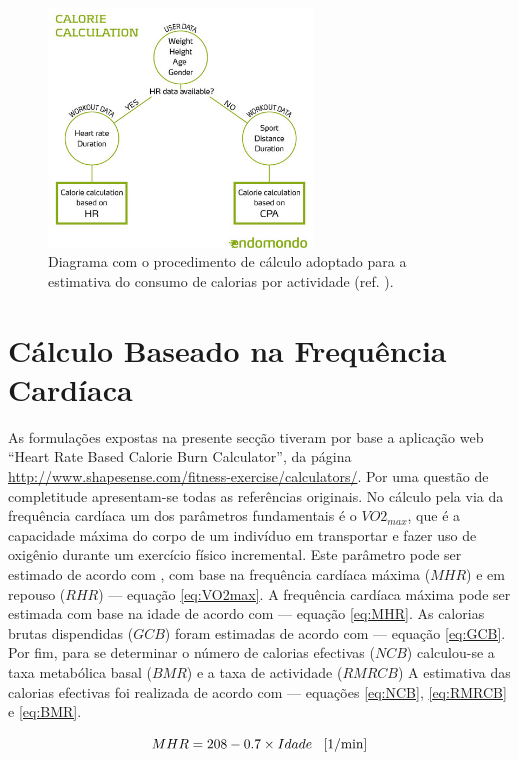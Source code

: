\documentclass[a4paper,10pt]{report}
\begin{document}
\begin{figure}
\centering
\includegraphics[width=7cm]{endomondoCalories.jpg}
\caption{Diagrama com o procedimento de cálculo adoptado para a estimativa do consumo de calorias por actividade (ref. \cite{endomondo}).}
\label{fig:caloriasProcedimento}
\end{figure}

\section{Cálculo Baseado na Frequência Cardíaca}
\label{sec:caloriasFcardio}
As formulações expostas na presente secção tiveram por base a aplicação web ``Heart Rate Based Calorie Burn Calculator'', 
da página \url{http://www.shapesense.com/fitness-exercise/calculators/}. Por uma questão de completitude apresentam-se todas as referências originais.
No cálculo pela via da frequência cardíaca um dos parâmetros fundamentais é o $VO2_{max}$, que é a capacidade máxima do corpo de um 
indivíduo em transportar e fazer uso de oxigênio durante um exercício físico incremental.
Este parâmetro pode ser estimado de acordo com \cite{VO2max}, com base na frequência cardíaca máxima ($MHR$) e em 
repouso ($RHR$) --- equação \ref{eq:VO2max}.
A frequência cardíaca máxima pode ser estimada com base na idade de acordo com \cite{MHR} --- equação \ref{eq:MHR}.
As calorias brutas dispendidas ($GCB$) foram estimadas de acordo com \cite{GCB} --- equação \ref{eq:GCB}.
Por fim, para se determinar o número de calorias efectivas ($NCB$) calculou-se a taxa metabólica basal ($BMR$) e a taxa de actividade ($RMRCB$)
A estimativa das calorias efectivas foi realizada de acordo com \cite{NCB} --- equações \ref{eq:NCB}, \ref{eq:RMRCB} e \ref{eq:BMR}.

\begin{equation} \label{eq:MHR} 
MHR = 208 - 0.7 \times Idade \text{\hspace*{0.3cm}[1/min]}
\end{equation}
\end{document}
